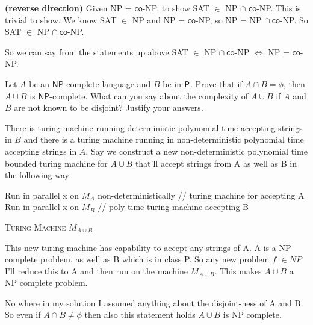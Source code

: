 \documentclass[12pt,a4, onecolumn]{exam}
\newcommand{\NP}{\ensuremath{\mathsf{NP}}}
\newcommand{\co}{\ensuremath{\mathsf{co}\mbox{-}}}
\begin{document}
\begin{questions}
\begin{solution}
        \textbf{(reverse direction)} Given NP = $\co$NP, to show SAT $\in$ NP $\cap$ $\co$NP. This is trivial to show. We know SAT $\in$ NP and NP = $\co$NP, so NP = NP $\cap \: \co$NP. So SAT $\in$ NP $\cap \: \co$NP.

        So we can say from the statements up above SAT $\in$ NP $\cap \: \co$NP $\iff$ NP = $\co$NP.
    \end{solution}

    \question Let $A$ be an $\NP$-complete language and $B$ be in ${\sf P}$. Prove that if $A \cap B = \phi$, then  $A \cup B$ is $\NP$-complete. What can you say about the complexity of $A \cup B$ if $A$ and $B$ are not known to be disjoint? Justify your answers.

    \begin{solution}
        There is turing machine running deterministic polynomial time accepting strings in $B$ and there is a turing machine running in non-deterministic polynomial time accepting strings in $A$. Say we construct a new non-deterministic polynomial time bounded turing machine for $A \cup B$ that'll accept strings from A as well as B in the following way

        \begin{algorithm}[H]
            
            \BlankLine
            Run in parallel x on $M_A$ non-deterministically // turing machine for accepting A\\
            Run in parallel x on $M_B$  // poly-time turing machine accepting B\\
            \caption{\textsc{Turing Machine} $M_{A \cup B}$}
        \end{algorithm}

        This new turing machine has capability to accept any strings of A. A is a NP complete problem, as well as B which is in class P. So any new problem $f$ $\in NP$ I'll reduce this to A and then run on the machine $M_{A \cup B}$. This makes $A \cup B$ a NP complete problem.

        No where in my solution I assumed anything about the disjoint-ness of A and B. So even if $A \cap B \neq \phi$ then also this statement holds $A \cup B$ is NP complete.
    \end{solution}


\end{questions}
\end{document}
